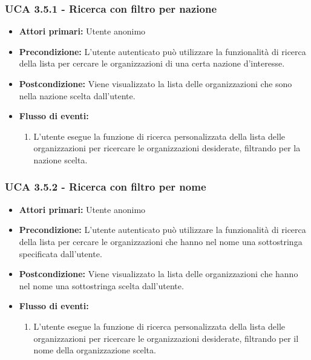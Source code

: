 \subsubsection{UCA 3.5.1 - Ricerca con filtro per nazione}%
\begin{itemize}
	\item \textbf{Attori primari:} Utente anonimo
	\item \textbf{Precondizione:} L'utente autenticato può utilizzare la funzionalità di ricerca della lista per cercare le organizzazioni di una certa nazione d'interesse.
	\item \textbf{Postcondizione:} Viene visualizzato la lista delle organizzazioni che sono nella nazione scelta dall'utente.
	\item \textbf{Flusso di eventi:}
	\begin{enumerate}
		\item L'utente esegue la funzione di ricerca personalizzata della lista delle organizzazioni per ricercare le organizzazioni desiderate, filtrando per la nazione scelta.
	\end{enumerate}
\end{itemize}

\subsubsection{UCA 3.5.2 - Ricerca con filtro per nome}%
\begin{itemize}
	\item \textbf{Attori primari:} Utente anonimo
	\item \textbf{Precondizione:} L'utente autenticato può utilizzare la funzionalità di ricerca della lista per cercare le organizzazioni che hanno nel nome una sottostringa specificata dall'utente.
	\item \textbf{Postcondizione:} Viene visualizzato la lista delle organizzazioni che hanno nel nome una sottostringa scelta dall'utente.
	\item \textbf{Flusso di eventi:}
	\begin{enumerate}
		\item L'utente esegue la funzione di ricerca personalizzata della lista delle organizzazioni per ricercare le organizzazioni desiderate, filtrando per il nome della organizzazione scelta.
	\end{enumerate}
\end{itemize}

